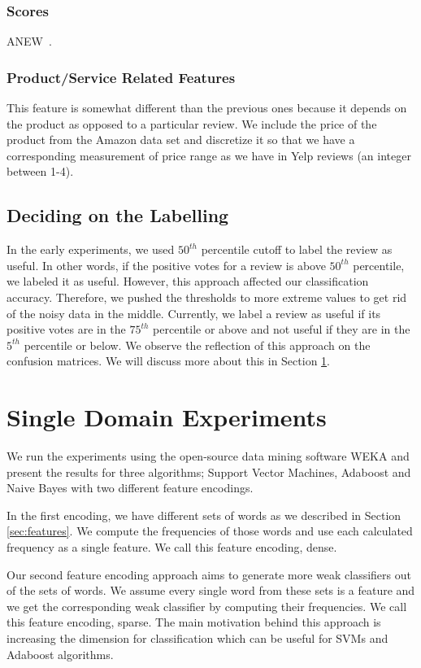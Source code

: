 \documentclass[letterpaper]{article}
\begin{document}
\subsubsection{Scores}
ANEW~\cite{DoddsANEWPaper}.

\subsubsection{Product/Service Related Features} 
This feature is somewhat different than the previous ones
because it depends on the product as opposed to a particular
review. We include the price of the product from the Amazon data set and
discretize it so that we have a corresponding measurement of price
range as we have in Yelp reviews (an integer between 1-4). 

\subsection{Deciding on the Labelling}
In the early experiments, we used $50^{th}$ percentile cutoff to label the
review as useful. In other words, if the positive votes for a review is above
$50^{th}$ percentile, we labeled it as useful. However, this approach affected our classification
accuracy. Therefore, we pushed the thresholds to more extreme values
to get rid of the noisy data in the middle. Currently, we label a review as useful
if its positive votes are in the $75^{th}$ percentile or above and not
useful if they are 
in the $5^{th}$ percentile or below. We observe the reflection of this
approach on the confusion matrices. We will discuss more about this in
Section \ref{sec:single_domain}.


\section{Single Domain Experiments}
\label{sec:single_domain}  
We run the experiments using the open-source data mining software WEKA \cite{weka}
and present the results for three algorithms; Support Vector Machines, Adaboost and
Naive Bayes with two different feature encodings. 

In the first encoding, we have different sets of words as we described in
Section \ref{sec:features}. We compute the frequencies of those
words and use each calculated frequency as a single feature. We call
this feature encoding, dense. 

Our second feature encoding approach aims to generate more weak
classifiers out of the sets of words. We assume every single word from
these sets is a feature and we get the corresponding weak classifier
by computing their frequencies. We call this feature encoding,
sparse. The main motivation behind this approach is increasing the
dimension for classification which can be useful for SVMs and Adaboost
algorithms.
\end{document}
